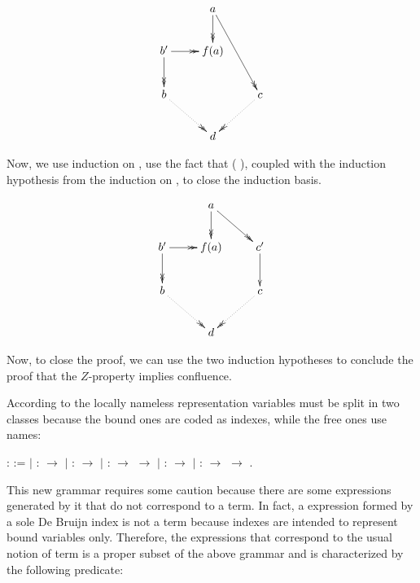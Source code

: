 \documentclass[conference]{IEEEtran}
\begin{document}
\[
  \xymatrix{
    & a \ar@{->>}[d] \ar@{->>}[rdd] & \\
    b' \ar@{->>}[r] \ar @{->>}[d] & f(a) &  \\
    b \ar @{.>>}[dr] & & c \ar@{.>>}[ld] \\
    & d &
  }
\]

Now, we use induction on    , use the fact that    ( ), coupled with the induction hypothesis from the induction on    , to close the induction basis.

\[
  \xymatrix{
    & a \ar@{->>}[d] \ar@{->>}[rd] \\
    b' \ar@{->>}[r] \ar @{->>}[d] & f(a) & c' \ar [d] \\
    b \ar @{.>>}[dr] & & c \ar@{.>>}[ld] \\
    & d &
  }
\]

Now, to close the proof, we can use the two induction hypotheses to conclude the proof that the $Z$-property implies confluence.

According to the locally nameless representation variables must be split in two classes because the bound ones are coded as indexes, while the free ones use names:

  \begin{coqdoccode}
    \coqdocnoindent {}  :
     :=\coqdoceol \coqdocindent{1.00em} \ensuremath{|}
     :  \ensuremath{\rightarrow}
    \coqdoceol \coqdocindent{1.00em} \ensuremath{|}
     :  \ensuremath{\rightarrow}
    \coqdoceol \coqdocindent{1.00em} \ensuremath{|}
     : 
    \ensuremath{\rightarrow} 
    \ensuremath{\rightarrow} \coqdoceol
    \coqdocindent{1.00em} \ensuremath{|}  :
     \ensuremath{\rightarrow}
    \coqdoceol \coqdocindent{1.00em} \ensuremath{|}
     : 
    \ensuremath{\rightarrow} 
    \ensuremath{\rightarrow} .\coqdoceol
  \end{coqdoccode}

  This new grammar requires some caution because there are some expressions generated by it that do not correspond to a term. In fact, a expression formed by a sole De Bruijn index is not a term because indexes are intended to represent bound variables only. Therefore, the expressions that correspond to the usual notion of term is a proper subset of the above grammar and is characterized by the following predicate:
\end{document}
